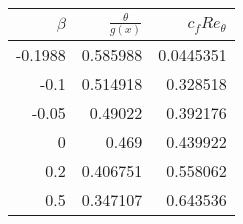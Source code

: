 \begin{tabular}{rrr}
\hline
   $\beta$ &   $\frac{\theta}{g(x)}$ &   $c_f Re_{\theta}$ \\
\hline
   -0.1988 &                0.585988 &           0.0445351 \\
   -0.1    &                0.514918 &           0.328518  \\
   -0.05   &                0.49022  &           0.392176  \\
    0      &                0.469    &           0.439922  \\
    0.2    &                0.406751 &           0.558062  \\
    0.5    &                0.347107 &           0.643536  \\
\hline
\end{tabular}